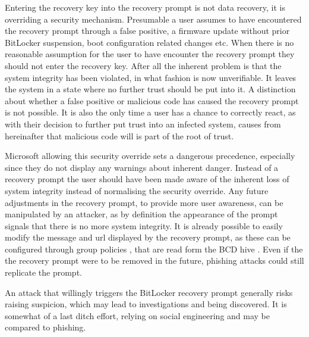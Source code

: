 Entering the recovery key into the recovery prompt is not data recovery, it is overriding a security mechanism.
Presumable a user assumes to have encountered the recovery prompt through a false positive, a firmware update without prior BitLocker suspension, boot configuration related changes etc.
When there is no reasonable assumption for the user to have encounter the recovery prompt they should not enter the recovery key.
After all the inherent problem is that the system integrity has been violated, in what fashion is now unverifiable.
It leaves the system in a state where no further trust should be put into it.
A distinction about whether a false positive or malicious code has caused the recovery prompt is not possible.
It is also the only time a user has a chance to correctly react, as with their decision to further put trust into an infected system, causes from hereinafter that malicious code will is part of the root of trust.

Microsoft allowing this security override sets a dangerous precedence, especially since they do not display any warnings about inherent danger.
Instead of a recovery prompt the user should have been made aware of the inherent loss of system integrity instead of normalising the security override.
Any future adjustments in the recovery prompt, to provide more user awareness, can be manipulated by an attacker, as by definition the appearance of the prompt signals that there is no more system integrity.
It is already possible to  easily modify the message and url displayed by the recovery prompt, as these can be configured through group policies \cite{microsoft-windows-bitlocker-group-policy-settings}, that are read form the \ac{BCD} hive \cite{microsoft-windows-bcd-settings-and-bitlocker}.
Even if the the recovery prompt were to be removed in the future, phishing attacks could still replicate the prompt.

An attack that willingly triggers the BitLocker recovery prompt generally risks raising suspicion, which may lead to investigations and being discovered.
It is somewhat of a last ditch effort, relying on social engineering and may be compared to phishing.







